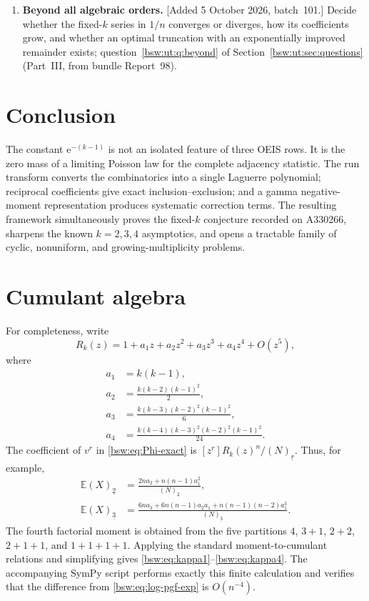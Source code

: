 \documentclass[11pt,letterpaper]{article}
\theoremstyle{definition}
\theoremstyle{remark}
\newcommand{\EE}{\mathbb E}
\newcommand{\ee}{\mathrm e}
\newcommand{\fall}[2]{(#1)_{\underline{#2}}}
\newcommand{\coef}[2]{[#1]#2}
\begin{document}
\begin{enumerate}[leftmargin=2em]
\item \textbf{Beyond all algebraic orders.}
[Added 5 October 2026, batch~101.]  Decide whether the fixed-$k$ series in
$1/n$ converges or diverges, how its coefficients grow, and whether an
optimal truncation with an exponentially improved remainder exists;
question~\ref{bsw:ut:q:beyond} of Section~\ref{bsw:ut:sec:questions}
(Part~III, from bundle Report~98).
\end{enumerate}

\section{Conclusion}

The constant $\ee^{-(k-1)}$ is not an isolated feature of three OEIS rows.  It
is the zero mass of a limiting Poisson law for the complete adjacency
statistic.  The run transform converts the combinatorics into a single
Laguerre polynomial; reciprocal coefficients give exact inclusion--exclusion;
and a gamma negative-moment representation produces systematic correction
terms.  The resulting framework simultaneously proves the fixed-$k$
conjecture recorded on A330266, sharpens the known $k=2,3,4$ asymptotics, and
opens a tractable family of cyclic, nonuniform, and growing-multiplicity
problems.

\appendix
\section{Cumulant algebra}\label{bsw:app:cumulant-algebra}

For completeness, write
\[
 R_k(z)=1+a_1z+a_2z^2+a_3z^3+a_4z^4+O(z^5),
\]
where
\begin{align*}
 a_1&=k(k-1),\\
 a_2&=\frac{k(k-2)(k-1)^2}{2},\\
 a_3&=\frac{k(k-3)(k-2)^2(k-1)^2}{6},\\
 a_4&=\frac{k(k-4)(k-3)^2(k-2)^2(k-1)^2}{24}.
\end{align*}
The coefficient of $v^r$ in \eqref{bsw:eq:Phi-exact} is
$\coef{z^r}R_k(z)^n/\fall Nr$.  Thus, for example,
\begin{align*}
 \EE\fall X2
 &=\frac{2na_2+n(n-1)a_1^2}{\fall N2},\\
 \EE\fall X3
 &=\frac{6na_3+6n(n-1)a_2a_1
       +n(n-1)(n-2)a_1^3}{\fall N3}.
\end{align*}
The fourth factorial moment is obtained from the five partitions
$4$, $3+1$, $2+2$, $2+1+1$, and $1+1+1+1$.  Applying the standard
moment-to-cumulant relations and simplifying gives
\eqref{bsw:eq:kappa1}--\eqref{bsw:eq:kappa4}.  The accompanying SymPy script performs
exactly this finite calculation and verifies that the difference from
\eqref{bsw:eq:log-pgf-exp} is $O(n^{-4})$.
\end{document}

